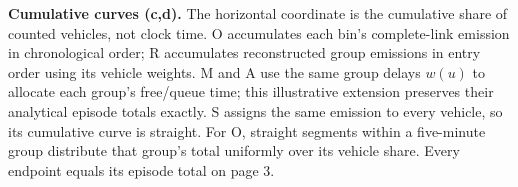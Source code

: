 \textbf{Cumulative curves (c,d).} The horizontal coordinate is the cumulative share of counted vehicles,
not clock time. O accumulates each bin's complete-link emission in chronological order;
R accumulates reconstructed group emissions in entry order using its vehicle weights.
M and A use the same group delays $w(u)$ to allocate each group's free/queue time; this illustrative
extension preserves their analytical episode totals exactly. S assigns the same emission to every vehicle,
so its cumulative curve is straight.
For O, straight segments within a five-minute group distribute that group's total uniformly over its vehicle share.
Every endpoint equals its episode total on page 3.

